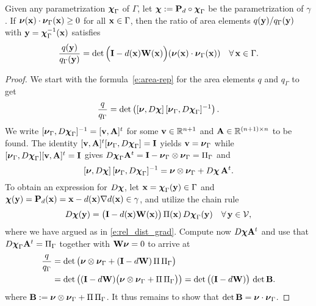 \begin{lemma}\label{L:area_ratio_distance}
  Given any parametrization ${\boldsymbol \chi}_\Gamma$ of $\Gamma$, let
  ${\boldsymbol \chi} := {\bf P}_d \circ {\boldsymbol \chi}_\Gamma$ be the parametrization of $\gamma$.
  If ${\boldsymbol \nu}({\bf x}) \cdot {\boldsymbol \nu}_\Gamma({\bf x})\ge0$ for all ${\bf x}\in\Gamma$,
  then the ratio of area elements $q({\bf y})/q_\Gamma({\bf y})$ with
  ${\bf y}={\boldsymbol \chi}_\Gamma^{-1}({\bf x})$ satisfies
%
\begin{equation}\label{e:area_ratio_distance}
  \frac{q({\bf y})}{q_\Gamma({\bf y})}
  = \det\Big({\bf I}-d({\bf x}) {\bf W}({\bf x})\Big) ({\boldsymbol \nu}({\bf x}) \cdot {\boldsymbol \nu}_\Gamma({\bf x}))
  \quad\forall \, {\bf x} \in \Gamma.
\end{equation}
\end{lemma}
%
\begin{proof}
We start with the formula~\eqref{e:area-rep} for the area elements $q$
and $q_\Gamma$ to get
%
\[
\frac{q}{q_\Gamma} = \det\left(\lbrack {\boldsymbol \nu}, D\boldsymbol{\mathcal{\chi}} \rbrack
\,\lbrack {\boldsymbol \nu}_\Gamma, D{\boldsymbol \chi}_\Gamma \rbrack^{-1} \right).
\]
%
We write $ \lbrack {\boldsymbol \nu}_\Gamma, D{\boldsymbol \chi}_\Gamma \rbrack^{-1} = \lbrack {\bf v},{\bf A} \rbrack^t$
for some ${\bf v} \in \mathbb R^{n+1}$ and ${\bf A}\in \mathbb R^{(n+1)\times n}$ to be found.
The identity  $ \lbrack {\bf v} , {\bf A} \rbrack^t  \lbrack {\boldsymbol \nu}_\Gamma, D{\boldsymbol \chi}_\Gamma \rbrack
= {\bf I}$ yields
$
{\bf v} = {\boldsymbol \nu}_\Gamma
$
while $   \lbrack {\boldsymbol \nu}_\Gamma, D{\boldsymbol \chi}_\Gamma \rbrack \lbrack {\bf v}, {\bf A} \rbrack^t= {\bf I}$ gives
$
D{\boldsymbol \chi}_\Gamma {\bf A}^t = {\bf I} - {\boldsymbol \nu}_\Gamma \otimes {\boldsymbol \nu}_\Gamma = \Pi_\Gamma
$ and
%
\[
\lbrack {\boldsymbol \nu}, D\boldsymbol{\mathcal{\chi}} \rbrack
\,\lbrack {\boldsymbol \nu}_\Gamma, D{\boldsymbol \chi}_\Gamma \rbrack^{-1}
={\boldsymbol \nu}\otimes{\boldsymbol \nu}_\Gamma + D{\boldsymbol \chi} \, {\bf A}^t.
\]
%
To obtain an expression for $D{\boldsymbol \chi}$, let ${\bf x} = {\boldsymbol \chi}_\Gamma({\bf y})\in\Gamma$ and
${\boldsymbol \chi}({\bf y}) = {\bf P}_d({\bf x}) = {\bf x} - d({\bf x})\nabla d({\bf x}) \in\gamma$, and utilize
the chain rule
%
\[
D{\boldsymbol \chi}({\bf y}) = \big({\bf I} - d({\bf x}){\bf W}({\bf x}) \big) \, \Pi({\bf x}) \, D{\boldsymbol \chi}_\Gamma({\bf y})
\quad\forall \, {\bf y}\in\mathcal{V},
\]
%
where we have argued as in \eqref{e:rel_dist_grad}. Compute now $D{\boldsymbol \chi}{\bf A}^t$
and use that $D{\boldsymbol \chi}_\Gamma{\bf A}^t=\Pi_\Gamma$ together with ${\bf W} {\boldsymbol \nu} =0$ to arrive at
%
\begin{align*}
\frac{q}{q_\Gamma} &= \det \big( {\boldsymbol \nu}\otimes{\boldsymbol \nu}_\Gamma
+ ({\bf I} - d{\bf W}) \, \Pi \, \Pi_\Gamma  \big) 
\\
& = \det\big( ({\bf I}-d{\bf W}) \big({\boldsymbol \nu} \otimes {\boldsymbol \nu}_\Gamma + \Pi \, \Pi_\Gamma \big) \big)
= \det\big( ({\bf I}-d{\bf W}) \big) \, \det{\bf B}.
\end{align*}
%
where ${\bf B} := {\boldsymbol \nu} \otimes {\boldsymbol \nu}_\Gamma + \Pi \,\Pi_\Gamma$. It thus remains to show that
$\det {\bf B} = {\boldsymbol \nu} \cdot {\boldsymbol \nu}_\Gamma$.


\end{proof}
